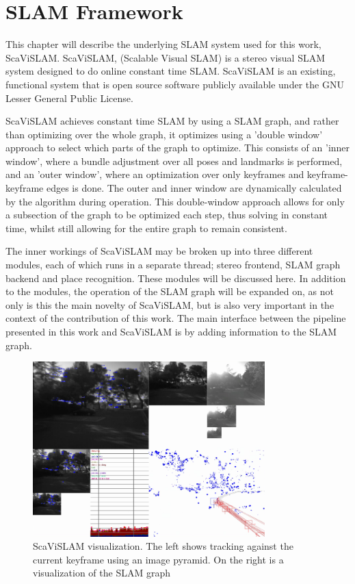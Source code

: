 \chapter{SLAM Framework}
\label{chapter:ScaViSLAM}

This chapter will describe the underlying SLAM system used for this work, \\ \mbox{ScaViSLAM}\cite{strasdat_11}.  \mbox{ScaViSLAM}, (Scalable Visual SLAM) is a stereo visual SLAM system designed to do online constant time SLAM.  ScaViSLAM is an existing, functional system that is open source software publicly available under the GNU Lesser General Public License.

ScaViSLAM achieves constant time SLAM by using a SLAM graph, and rather than optimizing over the whole graph, it optimizes using a 'double window' approach to select which parts of the graph to optimize.  This consists of an 'inner window', where a bundle adjustment over all poses and landmarks is performed, and an 'outer window', where an optimization over only keyframes and keyframe-keyframe edges is done. The outer and inner window are dynamically calculated by the algorithm during operation.  This double-window approach allows for only a subsection of the graph to be optimized each step, thus solving in constant time, whilst still allowing for the entire graph to remain consistent.

The inner workings of ScaViSLAM may be broken up into three different modules, each of which runs in a separate thread; stereo frontend, SLAM graph backend and place recognition. These modules will be discussed here. In addition to the modules, the operation of the SLAM graph will be expanded on, as not only is this the main novelty of ScaViSLAM, but is also very important in the context of the contribution of this work. The main interface between the pipeline presented in this work and ScaViSLAM is by adding information to the SLAM graph.

\begin{figure}[h!]
  \centering
    \includegraphics[width=0.8\textwidth]{chapters/images/scavislam_gui}
    \caption{ScaViSLAM visualization.  The left shows tracking against the current keyframe using an image pyramid.  On the right is a visualization of the SLAM graph}
  \label{fig:scavislam_gui}
\end{figure}

